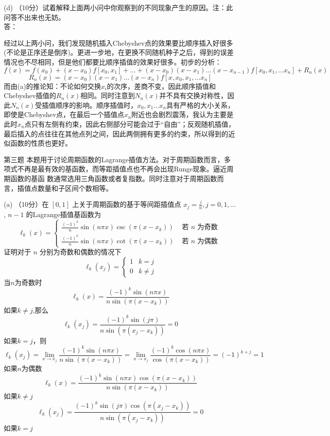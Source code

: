 \documentclass[12pt,a4paper,utf8]{ctexart}
\begin{document}
\begin{enumerate}
		\item[(d)]（10分）试着解释上面两小问中你观察到的不同现象产生的原因。注：此问答不出来也无妨。\\
		答：\par 
		\quad\quad 经过以上两小问，我们发现随机插入Chebyshev点的效果要比顺序插入好很多(不论是正序还是倒序)。更进一步地，在更换不同随机种子之后，得到的误差情况也不尽相同，但是他们都要比顺序插值的效果好很多。初步的分析：$$
		f(x)=f(x_{0})+(x-x_{0})f[x_{0},x_{1}]+\ldots+(x-x_{0})(x-x_{1})\ldots(x-x_{n-1})f[x_{0},x_{1},\ldots x_{n}]+R_{n}(x)$$
		$$R_{n}(x)=(x-x_{0})(x-x_{1})\ldots(x-x_{n})f[x,x_{0},x_{1},\ldots x_{n}]$$
		\quad\quad 而由(a)的推论知：不论如何交换$x_{i}$的次序，差商不变，因此顺序插值和Chebyshev插值的$R_{n}(x)$相同。同时注意到$N_{n}(x)$并不具有交换对称性，因此$N_{n}(x)$受插值顺序的影响。顺序插值时，$x_{0},x_{1}\ldots x_{n}$具有严格的大小关系，即使是Chebyshev点，在最后一个插值点$x_{n}$附近也会剧烈震荡，我认为主要是此时$x_{n}$点只有左侧有约束，因此右侧部分可能会过于“自由”；反观随机插值，最后插入的点往往在其他点列之间，因此两侧拥有更多的约束，所以得到的近似函数的性质也更好。
		
		\item[第三题]本题用于讨论周期函数的Lagrange插值方法。对于周期函数而言，多项式不再是最有效的基函数，而等距插值点也不再会出现Runge现象。逼近周期函数的基函 数通常选用三角函数或者复指数。同时注意对于周期函数而言，插值点数量和子区间个数相等。
		\item[(a)]（10分）在 $[0,1]$ 上关于周期函数的基于等间距插值点 $x_{j}=\frac{j}{n}, j=0,1, \ldots$, $n-1$ 的Lagrange插值基函数为
		$$
		\ell_{k}(x)=\left\{\begin{array}{ll}
			\frac{(-1)^{k}}{n} \sin (n \pi x) \csc \left(\pi\left(x-x_{k}\right)\right) & \text { 若 } n \text { 为奇数 } \\
			\frac{(-1)^{k}}{n} \sin (n \pi x) \cot \left(\pi\left(x-x_{k}\right)\right) & \text { 若 } n \text { 为偶数 }
		\end{array}\right.
		$$
		证明对于 $n$ 分别为奇数和偶数的情况下
		$$
		\ell_{k}\left(x_{j}\right)=\left\{\begin{array}{ll}
			1 & k=j \\
			0 & k \neq j
		\end{array}\right.
		$$
		当$n$为奇数时$$
		\ell_{k}(x)=\frac{(-1)^{k} \sin (n \pi x)}{n\sin \left(\pi\left(x-x_{k}\right)\right)}
		$$
		如果$k\neq j$,那么$$
		\ell_{k}\left(x_{j}\right)=\frac{(-1)^{k} \sin (j \pi )}{n\sin \left(\pi\left(x_{j}-x_{k}\right)\right)}=0
		$$
		如果$k=j$，则$$
		\ell_{k}\left(x_{j}\right)=\lim_{x\to x_{j}}\frac{(-1)^{k} \sin (n \pi x)}{n\sin \left(\pi\left(x-x_{k}\right)\right)}=\lim_{x\to x_{j}}\frac{(-1)^{k} \cos (n \pi x)}{\cos \left(\pi\left(x-x_{k}\right)\right)}=(-1)^{k+j}=1 $$
		如果$n$为偶数$$
		\ell_{k}(x)=\frac{(-1)^{k}\sin( n\pi x)\cos(\pi (x-x_{k}))}{n\sin(\pi (x-x_{k}))}
		$$如果$k\neq j$ $$
		\ell_{k}\left(x_{j}\right)=\frac{(-1)^{k}\sin( j\pi )\cos(\pi (x_{j}-x_{k}))}{n\sin(\pi (x_{j}-x_{k}))}=0
		$$如果$k=j$ 
		

\end{enumerate}
\end{document}

